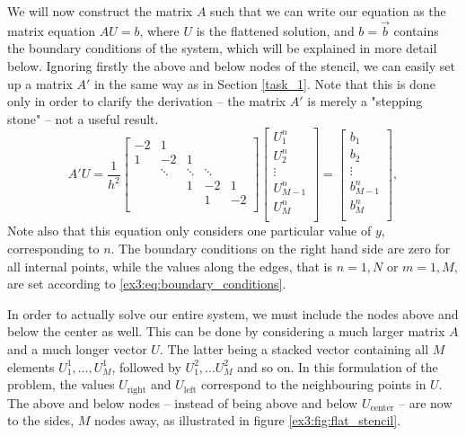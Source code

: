 We will now construct the matrix $A$ such that we can write our equation as the matrix equation $A U = b$, where $U$ is the flattened solution, and $b = \vec{b}$ contains the boundary conditions of the system, which will be explained in more detail below.
Ignoring firstly the above and below nodes of the stencil, we can easily set up a matrix $A'$ in the same way as in Section \ref{task_1}.
Note that this is done only in order to clarify the derivation -- the matrix $A'$ is merely a "stepping stone" -- not a useful result.
\begin{equation*}
    A'U = \frac{1}{h^2}
    \begin{bmatrix}
    -2& 1 \\
    1 & -2 & 1 &   \\
      & \ddots & \ddots & \ddots & \\
      &   & 1 & -2 & 1 \\
      &   &  & 1 & -2 \\
    \end{bmatrix}
    \begin{bmatrix}
    U_1^n \\ U_2^n \\ \vdots \\ U_{M-1}^n \\ U_M^n \\
    \end{bmatrix}
    =
    \begin{bmatrix}
    b_1 \\ b_2 \\ \vdots \\ b_{M-1}^n \\ b_M^n \\
    \end{bmatrix}
    ,
    \label{ex3:eq:simple_matrix}
\end{equation*}
Note also that this equation only considers one particular value of $y$, corresponding to $n$.
The boundary conditions on the right hand side are zero for all internal points, while the values along the edges, that is $n = {1, N}$ or $m = {1, M}$, are set according to \eqref{ex3:eq:boundary_conditions}.

In order to actually solve our entire system, we must include the nodes above and below the center as well.
This can be done by considering a much larger matrix $A$ and a much longer vector $U$.
The latter being a stacked vector containing all $M$ elements $U_1^1, \ldots, U_M^1$, followed by $U_1^2, \ldots U_M^2$ and so on.
In this formulation of the problem, the values $U_\text{right}$ and $U_\text{left}$ correspond to the neighbouring points in $U$.
The above and below nodes -- instead of being above and below $U_\text{center}$ -- are now to the sides, $M$ nodes away, as illustrated in figure \ref{ex3:fig:flat_stencil}.

